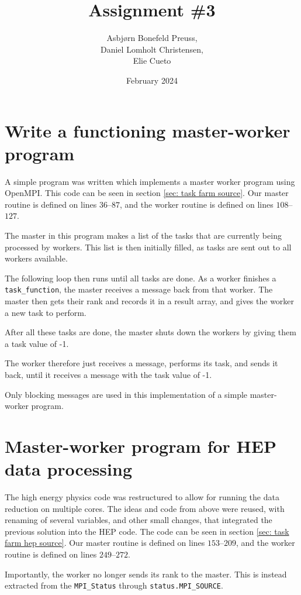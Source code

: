 \documentclass{article}
\title{Assignment \#3}
\author{Asbjørn Bonefeld Preuss,\\ Daniel Lomholt Christensen,\\ Elie Cueto}
\date{February 2024}
\begin{document}
\maketitle
{}
\renewcommand{\thesection}{Task \arabic{section}:}
\renewcommand{\thesubsection}{Subtask \arabic{section}\Alph{subsection}:}
\newpage
{}
\section{Write a functioning master-worker program}
A simple program was written which implements a master worker program using OpenMPI. This code can be seen in section \ref{sec: task farm source}. Our master routine is defined on lines $36$--$87$, and the worker routine is defined on lines $108$--$127$. 

The master in this program makes a list of the tasks that are currently being processed by workers. This list is then initially filled, as tasks are sent out to all workers available.

The following loop then runs until all tasks are done.
As a worker finishes a \verb|task_function|, the master receives a message back from that worker. The master then gets their rank and records it in a result array, and gives the worker a new task to perform.

After all these tasks are done, the master shuts down the workers by giving them a task value of -1.

The worker therefore just receives a message, performs its task, and sends it back, until it receives a message with the task value of -1.

Only blocking messages are used in this implementation of a simple master-worker program.

\section{Master-worker program for HEP data processing} 
The high energy physics code was restructured to allow for running the data reduction on multiple cores. The ideas and code from above were reused, with renaming of several variables, and other small changes, that integrated the previous solution into the HEP code. The code can be seen in section \ref{sec: task farm hep source}. Our master routine is defined on lines $153$--$209$, and the worker routine is defined on lines $249$--$272$. 

Importantly, the worker no longer sends its rank to the master. This is instead extracted from the \verb?MPI_Status? through \verb|status.MPI_SOURCE|.
\end{document}
